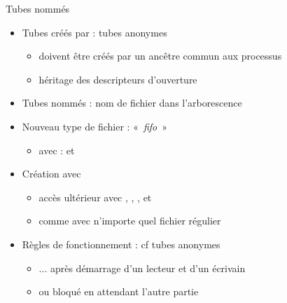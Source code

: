 \begin {frame} {Tubes nommés}

    \begin {itemize}
	\item Tubes créés par  : tubes anonymes
	    \begin {itemize}
		\item doivent être créés par un ancêtre commun aux
		    processus
		\item héritage des descripteurs d'ouverture
	    \end {itemize}
	\item Tubes nommés : nom de fichier dans l'arborescence
	\item Nouveau type de fichier : «~\textit {fifo}~»
	    \begin {itemize}
		\item avec  :  et
	    \end {itemize}
	\item Création avec 
	    \begin {itemize}
		\item accès ultérieur avec , ,
		    , et 
		\item \implique comme avec n'importe quel fichier régulier
	    \end {itemize}
	\item Règles de fonctionnement : cf tubes anonymes
	    \begin {itemize}
		\item ... après démarrage d'un lecteur et d'un écrivain
		\item {} ou  bloqué en attendant
		    l'autre partie
	    \end {itemize}
    \end {itemize}
\end {frame}



